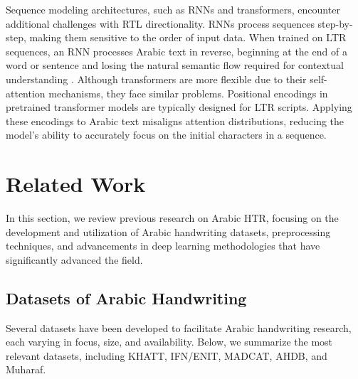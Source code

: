 \documentclass[conference]{IEEEtran}
\newcounter{customsubsubsection} %
\let\oldsubsection\subsection
\renewcommand{\subsection}[1]{%
  \oldsubsection{#1}%
  \setcounter{customsubsubsection}{0}%
}
\begin{document}
Sequence modeling architectures, such as RNNs and transformers, encounter additional challenges with RTL directionality. RNNs process sequences step-by-step, making them sensitive to the order of input data. When trained on LTR sequences, an RNN processes Arabic text in reverse, beginning at the end of a word or sentence and losing the natural semantic flow required for contextual understanding \cite{chan2024hatformer}. Although transformers are more flexible due to their self-attention mechanisms, they face similar problems. Positional encodings in pretrained transformer models are typically designed for LTR scripts. Applying these encodings to Arabic text misaligns attention distributions, reducing the model’s ability to accurately focus on the initial characters in a sequence.


\section{Related Work}
In this section, we review previous research on Arabic HTR, focusing on the development and utilization of Arabic handwriting datasets, preprocessing techniques, and advancements in deep learning methodologies that have significantly advanced the field.

\subsection{Datasets of Arabic Handwriting}

Several datasets have been developed to facilitate Arabic handwriting research, each varying in focus, size, and availability. Below, we summarize the most relevant datasets, including KHATT, IFN/ENIT, MADCAT, AHDB, and Muharaf.



  

\end{document}
